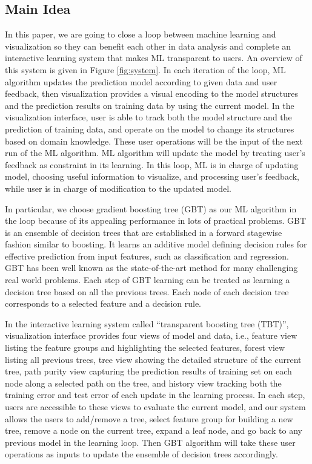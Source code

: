 \documentclass{chi2009}
\begin{document}
\subsection{Main Idea}

In this paper, we are going to close a loop between machine learning and visualization so they can benefit each other in data analysis and complete an interactive learning system that makes ML transparent to users. An overview of this system is given in Figure \ref{fig:system}. In each iteration of the loop, ML algorithm updates the prediction model according to given data and user feedback, then visualization provides a visual encoding to the model structures and the prediction results on training data by using the current model. In the visualization interface, user is able to track both the model structure and the prediction of training data, and operate on the model
to change its structures based on domain knowledge. These user operations will be the input of the next run of the ML algorithm. ML algorithm will update the model by treating user's feedback as constraint in its learning. In this loop, ML is in charge of updating model, choosing useful information to visualize, and processing user's feedback, while user is in charge of modification to the updated model. 

In particular, we choose gradient boosting tree (GBT) as our ML algorithm in the loop because of its appealing performance in lots of practical problems. GBT is an ensemble of decision trees that are established in a forward stagewise fashion similar to boosting. It learns an additive model defining  decision rules for effective prediction from input features, such as classification and regression. GBT has been well known as the state-of-the-art method for many challenging real world problems. Each step of GBT learning can be treated as learning a decision tree based on all the previous trees. Each node of each decision tree corresponds to a selected feature and a decision rule. 

In the interactive learning system called ``transparent boosting tree (TBT)'', visualization interface provides four views of model and data, i.e., feature view listing the feature groups and highlighting the selected features, forest view listing all previous trees, tree view showing the detailed structure of the current tree, path purity view capturing the prediction results of training set on each node along a selected path on the tree, and history view tracking both the training error and test error of each update in the learning process. In each step, users are accessible to these views to evaluate the current model, and our system allows the users to add/remove a tree, select feature group for building a new tree, remove a node on the current tree, expand a leaf node, and go back to any previous model in the learning loop. Then GBT algorithm will take these user operations as inputs to update the ensemble of decision trees accordingly. 
\end{document}
